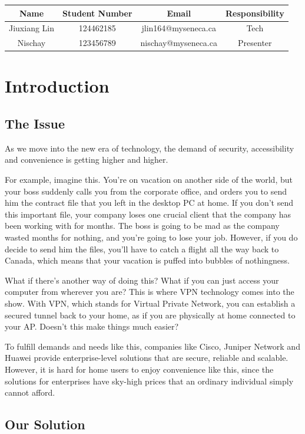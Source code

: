 \documentclass[12pt]{article}
\begin{document}
\begin{tabular}{| c | c | c | c |}
\hline
\textbf{Name} & \textbf{Student Number} & \textbf{Email} & \textbf{Responsibility} \\\hline
Jiuxiang Lin & 124462185 & jlin164@myseneca.ca & Tech \\\hline
Nischay & 123456789 & nischay@myseneca.ca & Presenter \\\hline
\end{tabular}

\section{Introduction}

\subsection{The Issue}
As we move into the new era of technology, the demand of security, accessibility and convenience is getting higher and higher.

For example, imagine this. You're on vacation on another side of the world, but your boss suddenly calls you from the corporate office, and orders you to send him the contract file that you left in the desktop PC at home. If you don't send this important file, your company loses one crucial client that the company has been working with for months. The boss is going to be mad as the company wasted months for nothing, and you're going to lose your job. However, if you do decide to send him the files, you'll have to catch a flight all the way back to Canada, which means that your vacation is puffed into bubbles of nothingness.

What if there's another way of doing this? What if you can just access your computer from wherever you are? This is where VPN technology comes into the show. With VPN, which stands for Virtual Private Network, you can establish a secured tunnel back to your home, as if you are physically at home connected to your AP. Doesn't this make things much easier?

To fulfill demands and needs like this, companies like Cisco, Juniper Network and Huawei provide enterprise-level solutions that are secure, reliable and scalable. However, it is hard for home users to enjoy convenience like this, since the solutions for enterprises have sky-high prices that an ordinary individual simply cannot afford.

\subsection{Our Solution}
\end{document}
